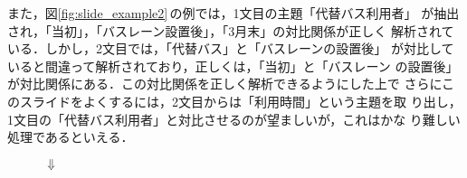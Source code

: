また，図\ref{fig:slide_example2}\,の例では，1文目の主題「代替バス利用者」
が抽出され，「当初」，「バスレーン設置後」，「3月末」の対比関係が正しく
解析されている．しかし，2文目では，「代替バス」と「バスレーンの設置後」
が対比していると間違って解析されており，正しくは，「当初」と「バスレーン
の設置後」が対比関係にある．この対比関係を正しく解析できるようにした上で
さらにこのスライドをよくするには，2文目からは「利用時間」という主題を取
り出し，1文目の「代替バス利用者」と対比させるのが望ましいが，これはかな
り難しい処理であるといえる．

\begin{figure}[t]
\begin{center}

\vspace{2mm}
$\Downarrow$
\vspace{2mm}


\end{center}
\end{figure}

